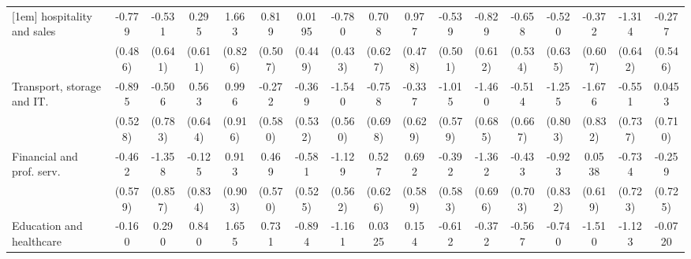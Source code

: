 {\begin{tabular}{l*{16}{c}}
[1em]
hospitality and sales&      -0.779         &      -0.531         &       0.295         &       1.663\sym{*}  &       0.819         &      0.0195         &      -0.780         &       0.708         &       0.977\sym{*}  &      -0.539         &      -0.829         &      -0.658         &      -0.520         &      -0.372         &      -1.314\sym{*}  &      -0.277         \\
                    &     (0.486)         &     (0.641)         &     (0.611)         &     (0.826)         &     (0.507)         &     (0.449)         &     (0.433)         &     (0.627)         &     (0.478)         &     (0.501)         &     (0.612)         &     (0.534)         &     (0.635)         &     (0.607)         &     (0.642)         &     (0.546)         \\
[1em]
Transport, storage and IT.&      -0.895         &      -0.506         &       0.563         &       0.996         &      -0.272         &      -0.369         &      -1.540\sym{**} &      -0.758         &      -0.337         &      -1.015         &      -1.460\sym{*}  &      -0.514         &      -1.255         &      -1.676\sym{*}  &      -0.551         &      0.0453         \\
                    &     (0.528)         &     (0.783)         &     (0.644)         &     (0.916)         &     (0.580)         &     (0.532)         &     (0.560)         &     (0.698)         &     (0.629)         &     (0.579)         &     (0.685)         &     (0.667)         &     (0.803)         &     (0.832)         &     (0.737)         &     (0.710)         \\
[1em]
Financial and prof. serv.&      -0.462         &      -1.358         &      -0.125         &       0.913         &       0.469         &      -0.581         &      -1.129\sym{*}  &       0.527         &       0.692         &      -0.392         &      -1.362         &      -0.433         &      -0.923         &      0.0538         &      -0.734         &      -0.259         \\
                    &     (0.579)         &     (0.857)         &     (0.834)         &     (0.903)         &     (0.570)         &     (0.525)         &     (0.562)         &     (0.626)         &     (0.589)         &     (0.583)         &     (0.696)         &     (0.703)         &     (0.832)         &     (0.619)         &     (0.723)         &     (0.725)         \\
[1em]
Education and healthcare&      -0.160         &       0.290         &       0.840         &       1.655         &       0.731         &      -0.894         &      -1.161\sym{*}  &      0.0325         &       0.154         &      -0.612         &      -0.372         &      -0.567         &      -0.740         &      -1.510\sym{*}  &      -1.123         &     -0.0720         \\

\end{tabular}}
